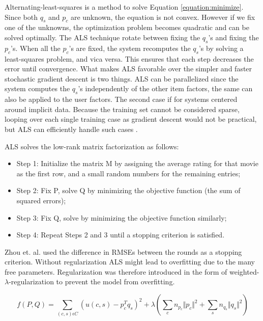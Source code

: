 Alternating-least-squares is a method to solve Equation \ref{equation:minimize}. Since both $q_{s}$ and $p_{c}$ are unknown, the equation is not convex. However if we fix one of the unknowns, the optimization problem becomes quadratic and can be solved optimally. The ALS technique rotate between fixing the $q_{s}$'s and fixing the $p_{c}$'s. When all the $p_{c}$'s are fixed, the system recomputes the $q_{s}$'s by solving a least-squares problem, and vica versa. This ensures that each step decreases the error until convergence. What makes ALS favorable over the simpler and faster stochastic gradient descent is two things. ALS can be parallelized since the system computes the $q_{s}$'s independently of the other item factors, the same can also be applied to the user factors. The second case if for systems centered around implicit data. Because the training set cannot be considered sparse, looping over each single training case as gradient descent would not be practical, but ALS can efficiently handle such cases \cite{Hu2008}.\newline

ALS solves the low-rank matrix factorization as follows:

\begin{itemize}
\item Step 1: Initialize the matrix M by assigning the average rating for that movie as the first row, and a small random numbers for the remaining entries;
\item Step 2: Fix P, solve Q by minimizing the objective function (the sum of squared errors);
\item Step 3: Fix Q, solve by minimizing the objective function similarly;
\item Step 4: Repeat Steps 2 and 3 until a stopping criterion is satisfied.
\end{itemize}

Zhou et. al. \cite{Zhou2008} used the difference in RMSEs between the rounds as a stopping criterion. Without regularization ALS might lead to overfitting due to the many free parameters. Regularization was therefore introduced in the form of weighted-$\lambda$-regularization to prevent the model from overfitting.

\begin{equation}
f(P, Q) = \sum_{(c,s)\epsilon C} (u(c,s) - p^{T}_{c}q_{s})^{2} + \lambda (\sum_{c} n_{p_{c}} \Vert p_{c} \Vert ^{2} + \sum_{s} n_{q_{s}} \Vert q_{s} \Vert ^{2})
\label{WeightedLamba}
\end{equation}

